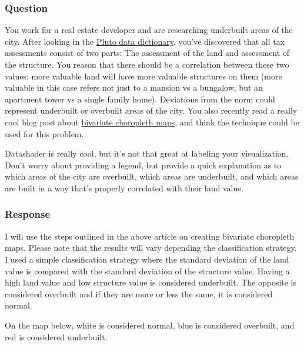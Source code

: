 \documentclass[11pt]{article}
\begin{document}
\subsubsection{Question}\label{question}

You work for a real estate developer and are researching underbuilt
areas of the city. After looking in the
\href{https://www1.nyc.gov/assets/planning/download/pdf/data-maps/open-data/pluto_datadictionary.pdf?v=17v1_1}{Pluto
data dictionary}, you've discovered that all tax assessments consist of
two parts: The assessment of the land and assessment of the structure.
You reason that there should be a correlation between these two values:
more valuable land will have more valuable structures on them (more
valuable in this case refers not just to a mansion vs a bungalow, but an
apartment tower vs a single family home). Deviations from the norm could
represent underbuilt or overbuilt areas of the city. You also recently
read a really cool blog post about
\href{http://www.joshuastevens.net/cartography/make-a-bivariate-choropleth-map/}{bivariate
choropleth maps}, and think the technique could be used for this
problem.

Datashader is really cool, but it's not that great at labeling your
visualization. Don't worry about providing a legend, but provide a quick
explanation as to which areas of the city are overbuilt, which areas are
underbuilt, and which areas are built in a way that's properly
correlated with their land value.

    \subsubsection{Response}\label{response}

I will use the steps outlined in the above article on creating bivariate
choropleth maps. Please note that the results will vary depending the
classification strategy. I used a simple classification strategy where
the standard deviation of the land value is compared with the standard
deviation of the structure value. Having a high land value and low
structure value is considered underbuilt. The opposite is considered
overbuilt and if they are more or less the same, it is considered
normal.

On the map below, white is considered normal, blue is considered
overbuilt, and red is considered underbuilt.
\end{document}
